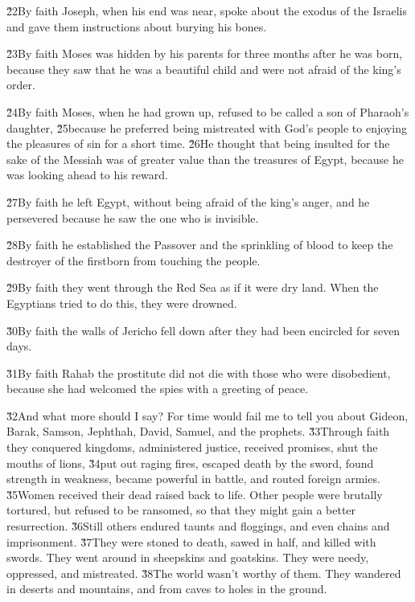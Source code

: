 \v{22}By faith Joseph, when his end was near, spoke about the exodus of the Israelis and gave them instructions about burying his bones.

\v{23}By faith Moses was hidden by his parents for three months after he was born, because they saw that he was a beautiful child and were not afraid of the king's order.

\v{24}By faith Moses, when he had grown up, refused to be called a son of Pharaoh's daughter, \v{25}because he preferred being mistreated with God's people to enjoying the pleasures of sin for a short time. \v{26}He thought that being insulted for the sake of the Messiah was of greater value than the treasures of Egypt, because he was looking ahead to his reward.

\v{27}By faith he left Egypt, without being afraid of the king's anger, and he persevered because he saw the one who is invisible.

\v{28}By faith he established the Passover and the sprinkling of blood to keep the destroyer of the firstborn from touching the people.

\v{29}By faith they went through the Red Sea as if it were dry land. When the Egyptians tried to do this, they were drowned.

\v{30}By faith the walls of Jericho fell down after they had been encircled for seven days.

\v{31}By faith Rahab the prostitute did not die with those who were disobedient, because she had welcomed the spies with a greeting of peace.

\v{32}And what more should I say? For time would fail me to tell you about Gideon, Barak, Samson, Jephthah, David, Samuel, and the prophets. \v{33}Through faith they conquered kingdoms, administered justice, received promises, shut the mouths of lions, \v{34}put out raging fires, escaped death by the sword, found strength in weakness, became powerful in battle, and routed foreign armies. \v{35}Women received their dead raised back to life. Other people were brutally tortured, but refused to be ransomed, so that they might gain a better resurrection. \v{36}Still others endured taunts and floggings, and even chains and imprisonment. \v{37}They were stoned to death, sawed in half, and killed with swords. They went around in sheepskins and goatskins. They were needy, oppressed, and mistreated. \v{38}The world wasn't worthy of them. They wandered in deserts and mountains, and from caves to holes in the ground.

